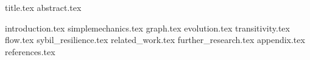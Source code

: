\documentclass[11pt]{llncs}
\begin{document}
{title.tex}
\thispagestyle{plain}
{abstract.tex}

{introduction.tex}
{simplemechanics.tex}
{graph.tex}
{evolution.tex}
{transitivity.tex}
{flow.tex}
{sybil_resilience.tex}
{related_work.tex}
{further_research.tex}
{appendix.tex}
{references.tex}
\end{document}
